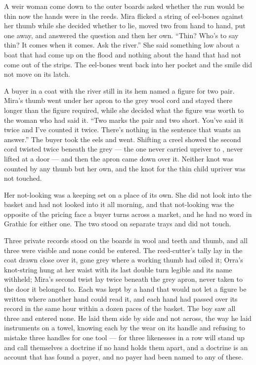 \scenebreak

A weir woman come down to the outer boards asked whether the run would be thin now the hands were in the reeds. Mira flicked a string of eel-bones against her thumb while she decided whether to lie, moved two from hand to hand, put one away, and answered the question and then her own. “Thin? Who's to say thin? It comes when it comes. Ask the river.” She said something low about a boat that had come up on the flood and nothing about the hand that had not come out of the strips. The eel-bones went back into her pocket and the smile did not move on its latch.

A buyer in a coat with the river still in its hem named a figure for two pair. Mira's thumb went under her apron to the grey wool cord and stayed there longer than the figure required, while she decided what the figure was worth to the woman who had said it. “Two marks the pair and two short. You've said it twice and I've counted it twice. There's nothing in the sentence that wants an answer.” The buyer took the eels and went. Shifting a creel showed the second cord twisted twice beneath the grey --- the one never carried upriver to , never lifted at a door --- and then the apron came down over it. Neither knot was counted by any thumb but her own, and the knot for the thin child upriver was not touched.

Her not-looking was a keeping set on a place of its own. She did not look into the basket and had not looked into it all morning, and that not-looking was the opposite of the pricing face a buyer turns across a market, and he had no word in Grathic for either one. The two stood on separate trays and did not touch.

Three private records stood on the boards in wool and teeth and thumb, and all three were visible and none could be entered. The reed-cutter's tally lay in the coat drawn close over it, gone grey where a working thumb had oiled it; Orra's knot-string hung at her waist with its last double turn legible and its name withheld; Mira's second twist lay twice beneath the grey apron, never taken to the door it belonged to. Each was kept by a hand that would not let a figure be written where another hand could read it, and each hand had passed over its record in the same hour within a dozen paces of the basket. The boy saw all three and entered none. He laid them side by side and not across, the way he laid instruments on a towel, knowing each by the wear on its handle and refusing to mistake three handles for one tool --- for three likenesses in a row will stand up and call themselves a doctrine if no hand holds them apart, and a doctrine is an account that has found a payer, and no payer had been named to any of these.

